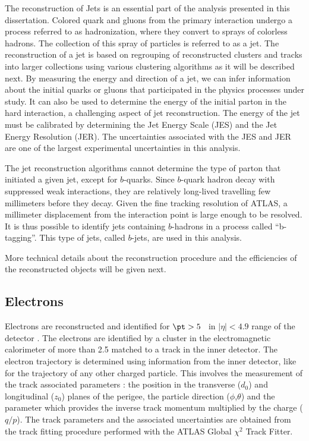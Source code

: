 The reconstruction of Jets is an essential part of the analysis presented in this dissertation. 
Colored quark and gluons from the primary interaction  undergo a process referred to as hadronization,
where they convert to sprays of colorless hadrons. The collection of this spray of particles is 
referred to as a jet. 
The reconstruction of a jet is based on regrouping of reconstructed clusters and tracks into larger collections using
various clustering algorithms as it will be described next.
By measuring the energy and direction of a jet, we can infer information 
about the initial quarks or gluons that participated in the physics processes under study.
It can also be used to determine the energy of the initial parton in the hard interaction, 
a challenging aspect of jet reconstruction.
The energy of the jet must be calibrated by determining the 
Jet Energy Scale (JES) and the Jet Energy Resolution (JER).%
The uncertainties associated with the JES and JER are one of the largest 
experimental uncertainties in this analysis.

The jet reconstruction algorithms cannot determine the type of parton that initiated a
given jet, except for $b$-quarks.
Since $b$-quark hadron decay with suppressed weak interactions, they are 
relatively long-lived travelling few millimeters before they decay.
Given the fine tracking resolution of ATLAS, 
a millimeter displacement from the interaction point is large enough to be resolved.
It is thus possible to identify jets containing $b$-hadrons  in a process called ``b-tagging''.
This type of jets, called $b$-jets, are used in this analysis.

More technical details about the reconstruction procedure and the efficiencies 
of the reconstructed objects will be given next.

\subsection{Electrons}
Electrons are reconstructed and identified for $\pt > 5$ \GeV~in $|\eta| < 4.9$ range of the detector \cite{ATLAS-CONF-2016-024}.
The electrons  are identified by a cluster in the electromagnetic calorimeter of more than 2.5 \GeV matched to a track in the inner detector.
The electron trajectory is determined using information from the inner detector, like for the trajectory
of any other charged particle. This involves the measurement of the track associated parameters : the
position in the transverse ($d_0$) and longitudinal ($z_0$) planes of the perigee, the particle direction ($\phi$,$\theta$)
and the parameter which provides the inverse track momentum multiplied by the charge ($q/p$). The track
parameters and the associated uncertainties are obtained from the track fitting procedure performed with
the ATLAS Global $\chi^2$ Track Fitter.


